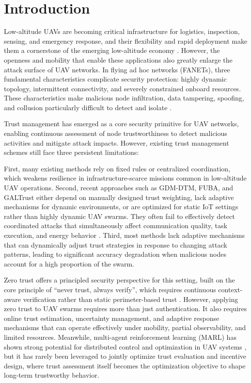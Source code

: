 \documentclass[notspecified,article,submit,moreauthors]{Definitions/mdpi}
\begin{document}
\section{Introduction}
Low-altitude UAVs are becoming critical infrastructure for logistics, inspection, sensing, and emergency response, and their flexibility and rapid deployment make them a cornerstone of the emerging low-altitude economy \cite{kundu2024survey}. However, the openness and mobility that enable these applications also greatly enlarge the attack surface of UAV networks. In flying ad hoc networks (FANETs), three fundamental characteristics complicate security protection: highly dynamic topology, intermittent connectivity, and severely constrained onboard resources. These characteristics make malicious node infiltration, data tampering, spoofing, and collusion particularly difficult to detect and isolate \cite{noor2020fanet}.

Trust management has emerged as a core security primitive for UAV networks, enabling continuous assessment of node trustworthiness to detect malicious activities and mitigate attack impacts. However, existing trust management schemes still face three persistent limitations:

First, many existing methods rely on fixed rules or centralized coordination, which weakens resilience in infrastructure-scarce missions common in low-altitude UAV operations. Second, recent approaches such as GDM-DTM, FUBA, and GALTrust either depend on manually designed trust weighting, lack adaptive mechanisms for dynamic environments, or are optimized for static IoT settings rather than highly dynamic UAV swarms. They often fail to effectively detect coordinated attacks that simultaneously affect communication quality, task execution, and energy behavior \cite{hu2025gdm,benfriha2024fuba,akram2024galtrust}. Third, most methods lack adaptive mechanisms that can dynamically adjust trust strategies in response to changing attack patterns, leading to significant accuracy degradation when malicious nodes account for a high proportion of the swarm.

Zero trust offers a principled security perspective for this setting, built on the core principle of ``never trust, always verify'', which requires continuous context-aware verification rather than static perimeter-based trust \cite{rose2020zero}. However, applying zero trust to UAV swarms requires more than just authentication. It also requires online trust estimation, uncertainty management, and adaptive response mechanisms that can operate effectively under mobility, partial observability, and limited resources. Meanwhile, multi-agent reinforcement learning (MARL) has shown strong potential for distributed control and optimization in UAV systems \cite{ekechi2025survey}, but it has rarely been leveraged to jointly optimize trust evaluation and incentive design, where trust assessment itself becomes the optimization objective to shape long-term trustworthy behavior.
\end{document}
